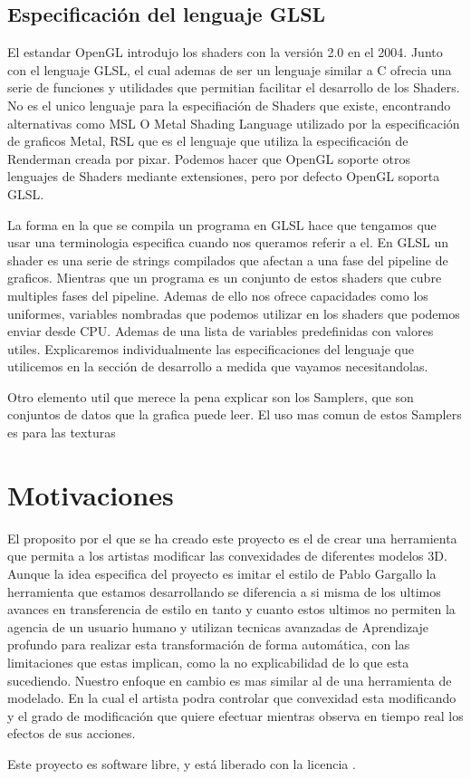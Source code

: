 \subsection{Especificación del lenguaje GLSL}

El estandar OpenGL introdujo los shaders con la versión 2.0 en el 2004. Junto con el lenguaje GLSL, el cual ademas de ser un lenguaje similar a C ofrecia una serie de funciones y utilidades que permitian facilitar el desarrollo de los Shaders. No es el unico lenguaje para la especifiación de Shaders que existe, encontrando alternativas como MSL O Metal Shading Language utilizado por la especificación de graficos Metal, RSL que es el lenguaje que utiliza la especificación de Renderman creada por pixar. Podemos hacer que OpenGL soporte otros lenguajes de Shaders mediante extensiones,
 pero por defecto OpenGL soporta GLSL.

La forma en la que se compila un programa en GLSL hace que tengamos que usar una terminologia especifica cuando nos queramos referir a el. En GLSL un shader es una serie de strings compilados que afectan a una fase del pipeline de graficos. Mientras que un programa es un conjunto de estos shaders que cubre multiples fases del pipeline. Ademas de ello nos ofrece capacidades como los uniformes, variables nombradas que podemos utilizar en los shaders que podemos enviar desde CPU. Ademas de una lista de variables predefinidas con valores utiles. Explicaremos individualmente las especificaciones del lenguaje
que utilicemos en la sección de desarrollo a medida que vayamos necesitandolas.

Otro elemento util que merece la pena explicar son los Samplers, que son conjuntos de datos que la grafica puede leer. El uso mas comun de estos Samplers es para las texturas



\section{Motivaciones}

El proposito por el que se ha creado este proyecto es el de crear una herramienta que permita a los artistas modificar las convexidades de diferentes modelos 3D. Aunque la idea especifica del proyecto es imitar el estilo de Pablo Gargallo la herramienta que estamos desarrollando se diferencia a si misma de los ultimos
avances en transferencia de estilo en tanto y cuanto estos ultimos no permiten la agencia de un usuario humano y utilizan tecnicas avanzadas de Aprendizaje profundo para realizar esta transformación de forma automática, con las limitaciones que estas implican, como la no explicabilidad de lo que esta sucediendo. Nuestro enfoque en cambio es mas similar al de una herramienta de modelado. En la cual el artista podra
controlar que convexidad esta modificando y el grado de modificación que quiere efectuar mientras observa en tiempo real los efectos de sus acciones.


Este proyecto es software libre, y está liberado con la licencia \cite{gplv3}.
